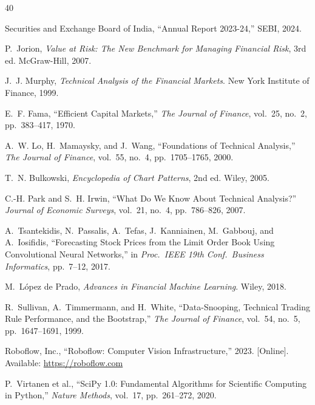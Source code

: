 \documentclass[12pt,a4paper]{article}
\begin{document}
\newpage
\begin{thebibliography}{40}

Securities and Exchange Board of India, ``Annual Report 2023-24,'' SEBI, 2024.

P.~Jorion, \textit{Value at Risk: The New Benchmark for Managing Financial Risk}, 3rd ed. McGraw-Hill, 2007.

J.~J. Murphy, \textit{Technical Analysis of the Financial Markets}. New York Institute of Finance, 1999.

E.~F. Fama, ``Efficient Capital Markets,'' \textit{The Journal of Finance}, vol.~25, no.~2, pp.~383--417, 1970.

A.~W. Lo, H.~Mamaysky, and J.~Wang, ``Foundations of Technical Analysis,'' \textit{The Journal of Finance}, vol.~55, no.~4, pp.~1705--1765, 2000.

T.~N. Bulkowski, \textit{Encyclopedia of Chart Patterns}, 2nd ed. Wiley, 2005.

C.-H. Park and S.~H. Irwin, ``What Do We Know About Technical Analysis?'' \textit{Journal of Economic Surveys}, vol.~21, no.~4, pp.~786--826, 2007.

A.~Tsantekidis, N.~Passalis, A.~Tefas, J.~Kanniainen, M.~Gabbouj, and A.~Iosifidis, ``Forecasting Stock Prices from the Limit Order Book Using Convolutional Neural Networks,'' in \textit{Proc.~IEEE 19th Conf.~Business Informatics}, pp.~7--12, 2017.

M.~L\'{o}pez de Prado, \textit{Advances in Financial Machine Learning}. Wiley, 2018.

R.~Sullivan, A.~Timmermann, and H.~White, ``Data-Snooping, Technical Trading Rule Performance, and the Bootstrap,'' \textit{The Journal of Finance}, vol.~54, no.~5, pp.~1647--1691, 1999.

Roboflow, Inc., ``Roboflow: Computer Vision Infrastructure,'' 2023. [Online]. Available: \url{https://roboflow.com}

P.~Virtanen et al., ``SciPy 1.0: Fundamental Algorithms for Scientific Computing in Python,'' \textit{Nature Methods}, vol.~17, pp.~261--272, 2020.


\end{thebibliography}
\end{document}
